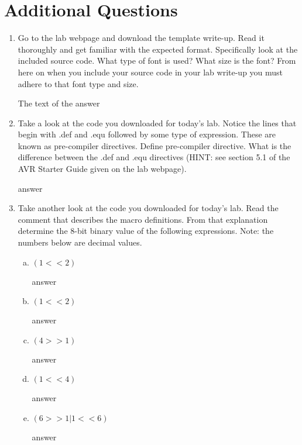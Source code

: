 \documentclass[12pt,letterpaper]{article}
\begin{document}
\section{Additional Questions}
\begin{enumerate}

    \item Go to the lab webpage and download the template write-up. Read it
        thoroughly and get familiar with the expected format.  Specifically
        look at the included source code. What type of font is used? What size
        is the font? From here on when you include your source code in your lab
        write-up you must adhere to that font type and size.

        The text of the answer

    \item Take a look at the code you downloaded for today’s lab. Notice the
        lines that begin with .def and .equ followed by some type of
        expression. These are known as pre-compiler directives. Define
        pre-compiler directive. What is the difference between the .def and
        .equ directives (HINT: see section 5.1 of the AVR Starter Guide given
        on the lab webpage).

        answer

    \item Take another look at the code you downloaded for today’s lab. Read
        the comment that describes the macro definitions. From that explanation
        determine the 8-bit binary value of the following expressions. Note:
        the numbers below are decimal values.

        \begin{enumerate}[a.]

            \item $(1<<2)$
            
                answer

            \item $(1<<2)$
            
                answer

            \item $(4>>1)$
                
                answer

            \item $(1<<4)$
            
                answer

            \item $(6>>1|1<<6)$
            
                answer

        \end{enumerate}

\end{enumerate}
\end{document}
